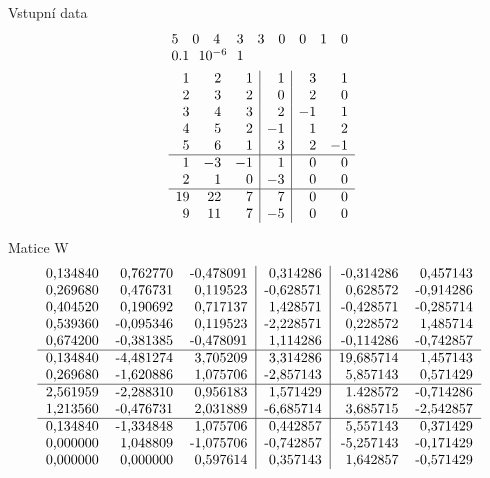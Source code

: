
\begin{Example}{Vstupní data}
\begin{align*}
\begin{array}{rrrrrrrrr}
 5 &  0 & 4 & 3 & 3 & 0 & 0 & 1 & 0 \\
\multicolumn{4}{l}{0.1 ~~ 10^{-6} ~~ 1} \\
\end{array}
\\
\begin{array}{rrr|r|rr}
1 & 2 & 1 &  1 & 3 & 1 \\
2 & 3 & 2 &  0 & 2 & 0 \\
3 & 4 & 3 &  2 &-1 & 1 \\
4 & 5 & 2 & -1 & 1 & 2 \\
5 & 6 & 1 &  3 & 2 &-1 \\
\hline
1 &-3 &-1 &  1 & 0 & 0 \\
2 & 1 & 0 & -3 & 0 & 0 \\
\hline
19& 22& 7 &  7 & 0 & 0 \\
 9& 11& 7 & -5 & 0 & 0 \\
\end{array}
\end{align*}
\end{Example}

%
\begin{Example}{Matice W}
\begin{align*}
\begin{tabular}{rrr|r|rr}
  0,134840 &  0,762770 &  -0,478091 &  0,314286 & -0,314286 &  0,457143 \\
  0,269680 &  0,476731 &   0,119523 & -0,628571 &  0,628572 & -0,914286 \\
  0,404520 &  0,190692 &   0,717137 &  1,428571 & -0,428571 & -0,285714 \\
  0,539360 & -0,095346 &   0,119523 & -2,228571 &  0,228572 &  1,485714 \\
  0,674200 & -0,381385 &  -0,478091 &  1,114286 & -0,114286 & -0,742857 \\
  \hline
  0,134840 & -4,481274 &   3,705209 &  3,314286 &19,685714 &   1,457143 \\
  0,269680 & -1,620886 &   1,075706 & -2,857143 & 5,857143  &  0,571429 \\
  \hline
  2,561959 & -2,288310 &  0,956183  &  1,571429  & 1.428572 & -0,714286 \\
  1,213560 & -0,476731 &  2,031889  & -6,685714 & 3,685715  & -2,542857 \\
  \hline
  0,134840 & -1,334848 &  1,075706  &  0,442857 & 5,557143  &  0,371429 \\
  0,000000 &  1,048809 & -1,075706  & -0,742857 &-5,257143  & -0,171429 \\
  0,000000 &  0,000000 &  0,597614  &  0,357143 & 1,642857  & -0,571429 \\
\end{tabular}
\end{align*}
\end{Example}


